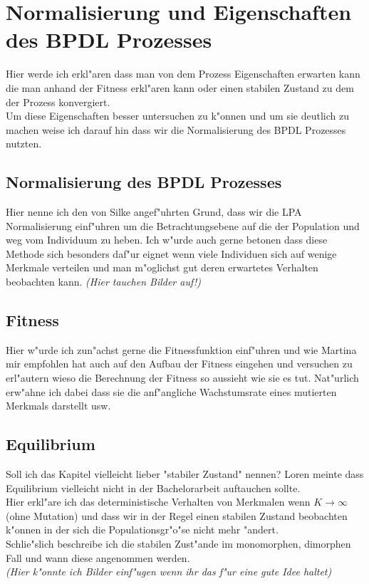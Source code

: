 \documentclass[11pt, a4paper, german]{article}
\begin{document}
	
\clearpage
\section{Normalisierung und Eigenschaften des BPDL Prozesses}
Hier werde ich erkl"aren dass man von dem Prozess Eigenschaften erwarten kann die man anhand der Fitness erkl"aren kann oder einen stabilen Zustand zu dem der Prozess konvergiert. \\
Um diese Eigenschaften besser untersuchen zu k"onnen und um sie deutlich zu machen weise ich darauf hin dass wir die Normalisierung des BPDL Prozesses nutzten.

	\subsection{Normalisierung des BPDL Prozesses}
	Hier nenne ich den von Silke angef"uhrten Grund, dass wir die LPA Normalisierung einf"uhren um die Betrachtungsebene auf die der Population und weg vom Individuum zu heben. Ich w"urde auch gerne betonen dass diese Methode sich besonders daf"ur eignet wenn viele Individuen sich auf wenige Merkmale verteilen und man m"oglichst gut deren erwartetes Verhalten beobachten kann. \textit{(Hier tauchen Bilder auf!)}

	\subsection{Fitness}
	Hier w"urde ich zun"achst gerne die Fitnessfunktion einf"uhren und wie Martina mir empfohlen hat auch auf den Aufbau der Fitness eingehen und versuchen zu erl"autern wieso die Berechnung der Fitness so aussieht wie sie es tut. Nat"urlich erw"ahne ich dabei dass sie die anf"angliche Wachstumsrate eines mutierten Merkmals darstellt usw.
	
	\subsection{Equilibrium}
	Soll ich das Kapitel vielleicht lieber "{}stabiler Zustand"{} nennen? Loren meinte dass Equilibrium vielleicht nicht in der Bachelorarbeit auftauchen sollte.\\
	Hier erkl"are ich das deterministische Verhalten von Merkmalen wenn $ K\to \infty $ (ohne Mutation) und dass wir in der Regel einen stabilen Zustand beobachten k"onnen in der sich die Populationsgr"o"se nicht mehr "andert.\\
	Schlie"slich beschreibe ich die stabilen Zust"ande im monomorphen, dimorphen Fall und wann diese angenommen werden.\\
	\textit{(Hier k"onnte ich Bilder einf"ugen wenn ihr das f"ur eine gute Idee haltet)}
\end{document}
